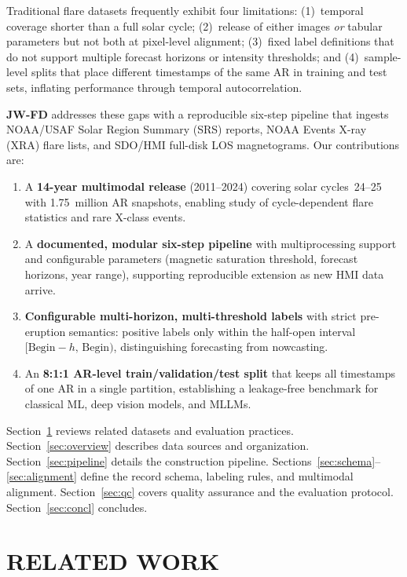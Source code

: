 \documentclass[]{spie}
\begin{document}
Traditional flare datasets frequently exhibit four limitations: (1)~temporal coverage shorter than a full solar cycle; (2)~release of either images \emph{or} tabular parameters but not both at pixel-level alignment; (3)~fixed label definitions that do not support multiple forecast horizons or intensity thresholds; and (4)~sample-level splits that place different timestamps of the same AR in training and test sets, inflating performance through temporal autocorrelation.\cite{Bloomfield2012,Barnes2016}

\textbf{JW-FD} addresses these gaps with a reproducible six-step pipeline that ingests NOAA/USAF Solar Region Summary (SRS) reports, NOAA Events X-ray (XRA) flare lists, and SDO/HMI\cite{Scherrer2012,Pesnell2012} full-disk LOS magnetograms. Our contributions are:
\begin{enumerate}
\item A \textbf{14-year multimodal release} (2011--2024) covering solar cycles~24--25 with 1.75~million AR snapshots, enabling study of cycle-dependent flare statistics and rare X-class events.
\item A \textbf{documented, modular six-step pipeline} with multiprocessing support and configurable parameters (magnetic saturation threshold, forecast horizons, year range), supporting reproducible extension as new HMI data arrive.
\item \textbf{Configurable multi-horizon, multi-threshold labels} with strict pre-eruption semantics: positive labels only within the half-open interval $[\mathrm{Begin}-h,\,\mathrm{Begin})$, distinguishing forecasting from nowcasting.
\item An \textbf{8:1:1 AR-level train/validation/test split} that keeps all timestamps of one AR in a single partition, establishing a leakage-free benchmark for classical ML, deep vision models, and MLLMs.
\end{enumerate}

Section~\ref{sec:related} reviews related datasets and evaluation practices. Section~\ref{sec:overview} describes data sources and organization. Section~\ref{sec:pipeline} details the construction pipeline. Sections~\ref{sec:schema}--\ref{sec:alignment} define the record schema, labeling rules, and multimodal alignment. Section~\ref{sec:qc} covers quality assurance and the evaluation protocol. Section~\ref{sec:concl} concludes.

\section{RELATED WORK}
\label{sec:related}
\end{document}

